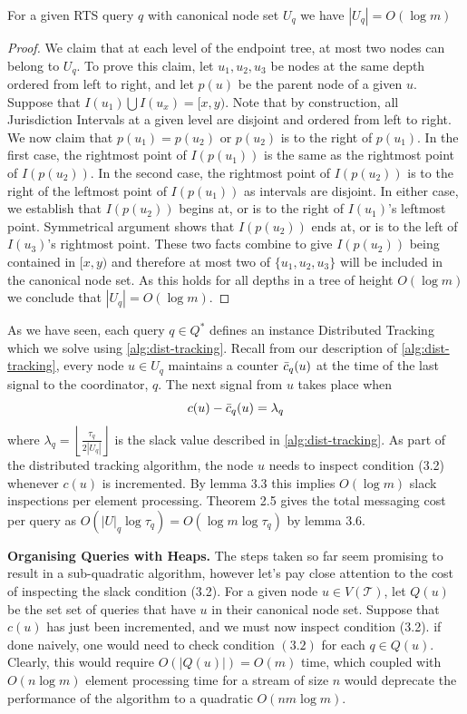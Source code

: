 \begin{lemma}
    For a given RTS query $q$ with canonical node set $U_q$ we have $|U_q| = O(\log m)$
\end{lemma}
\begin{proof}
We claim that at each level of the endpoint tree, at most two nodes can belong to $U_q$. To prove this claim, let $u_1, u_2, u_3$ be nodes at the same depth ordered from left to right, and let $p(u)$ be the parent node of a given $u$.  Suppose that $I(u_1)\bigcup I(u_x) = [x, y)$. Note that by construction, all Jurisdiction Intervals at a given level are disjoint and ordered from left to right. We now claim that $p(u_1) = p(u_2)$ or $p(u_2)$ is to the right of $p(u_1)$. In the first case, the rightmost point of $I(p(u_1))$ is the same as the rightmost point of $I(p(u_2))$. In the second case, the rightmost point of $I(p(u_2))$ is to the right of the leftmost point of $I(p(u_1))$ as intervals are disjoint. In either case, we establish that $I(p(u_2))$ begins at, or is to the right of $I(u_1)$'s leftmost point. Symmetrical argument shows that $I(p(u_2))$ ends at, or is to the left of $I(u_3)$'s rightmost point. These two facts combine to give $I(p(u_2))$ being contained in $[x, y)$ and therefore at most two of $\{u_1, u_2, u_3\}$ will be included in the canonical node set.  As this holds for all depths in a tree of height $O(\log m)$ we conclude that $|U_q| = O(\log m)$.
\end{proof}

 As we have seen, each query $q\in Q^*$ defines an instance Distributed Tracking which we solve using \cref{alg:dist-tracking}. Recall from our description of \cref{alg:dist-tracking}, every node $u\in U_q$ maintains a counter $\Bar{c}_q(u)$ at the time of the last signal to the coordinator, $q$. The next signal from $u$ takes place when
\begin{equation}
    c(u) - \Bar{c}_q(u) = \lambda_q
\end{equation}
where $\lambda_q = \left\lfloor \frac{\tau_q}{2 |U_q|}\right\rfloor$ is the slack value described in \cref{alg:dist-tracking}. As part of the distributed tracking algorithm, the node $u$ needs to inspect condition (3.2) whenever $c(u)$ is incremented. By lemma 3.3 this implies $O(\log m)$ slack inspections per element processing. Theorem 2.5 gives the total messaging cost per query as $O(|U|_q\log \tau_q) = O(\log m\log\tau_q)$ by lemma 3.6.

\textbf{Organising Queries with Heaps.} The steps taken so far seem promising to result in a sub-quadratic algorithm, however let's pay close attention to the cost of inspecting the slack condition (3.2). For a given node $u\in V(\mathcal{T})$, let $Q(u)$ be the set set of queries that have $u$ in their canonical node set. Suppose that $c(u)$ has just been incremented, and we must now inspect condition (3.2). if done naively, one would need to check condition $(3.2)$ for each $q\in Q(u)$. Clearly, this would require $O(|Q(u)|) = O(m)$ time, which coupled with $O(n\log m)$ element processing time for a stream of size $n$ would deprecate the performance of the algorithm to a quadratic $O(nm\log m)$.


